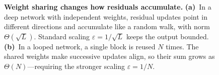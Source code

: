 \begin{figure}[t]
  \centering
  \resizebox{\textwidth}{!}{}
  \caption{\textbf{Weight sharing changes how residuals accumulate.}
  \textbf{(a)}~In a deep network with independent weights, residual updates point in different directions and accumulate like a random walk, with norm $\Theta(\!\sqrt{L})$. Standard scaling $\varepsilon=1/\!\sqrt{L}$ keeps the output bounded.
  \textbf{(b)}~In a looped network, a single block is reused $N$ times. The shared weights make successive updates align, so their sum grows as $\Theta(N)$---requiring the stronger scaling $\varepsilon=1/N$.}
  \label{fig:main-schematic}
\vspace{-0.3cm}
\end{figure}
